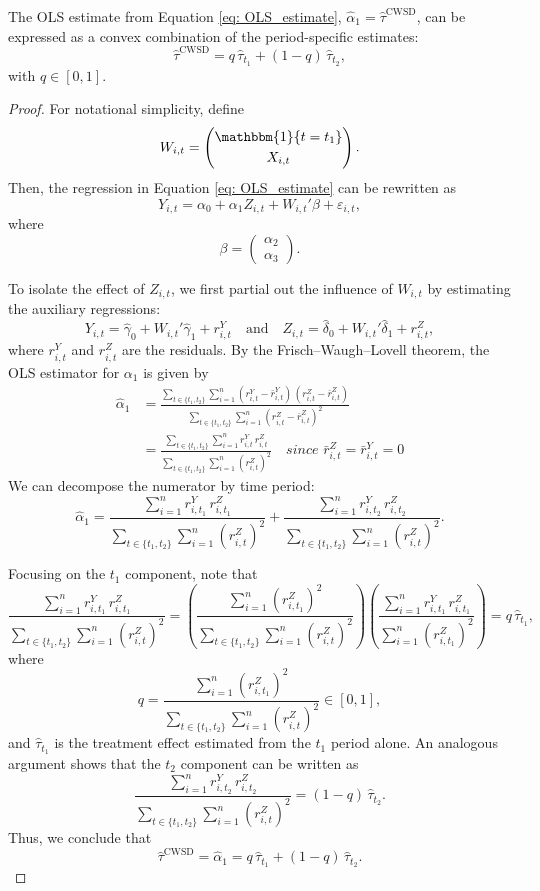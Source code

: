 \begin{reprop}
The OLS estimate from Equation \eqref{eq: OLS_estimate}, \(\hat{\alpha}_1 = \hat{\tau}^{\text{CWSD}}\), can be expressed as a convex combination of the period-specific estimates:
\[
\hat{\tau}^{\text{CWSD}} = q\,\hat{\tau}_{t_1} + (1-q)\,\hat{\tau}_{t_2},
\]
with \(q \in [0,1]\).
\end{reprop}

\begin{proof}
For notational simplicity, define
\[
W_{i,t} = \begin{pmatrix} \mathbbm{1}\{t = t_1\} \\[1mm] X_{i,t} \end{pmatrix}.
\]
Then, the regression in Equation \eqref{eq: OLS_estimate} can be rewritten as
\[
Y_{i,t} = \alpha_0 + \alpha_1 Z_{i,t} + W_{i,t}'\beta + \varepsilon_{i,t},
\]
where
\[
\beta = \begin{pmatrix} \alpha_2 \\ \alpha_3 \end{pmatrix}.
\]

To isolate the effect of \(Z_{i,t}\), we first partial out the influence of \(W_{i,t}\) by estimating the auxiliary regressions:
\[
Y_{i,t} = \hat{\gamma}_0 + W_{i,t}'\hat{\gamma}_1 + r^Y_{i,t} \quad \text{and} \quad Z_{i,t} = \hat{\delta}_0 + W_{i,t}'\hat{\delta}_1 + r^Z_{i,t},
\]
where \(r^Y_{i,t}\) and \(r^Z_{i,t}\) are the residuals. By the Frisch–Waugh–Lovell theorem, the OLS estimator for \(\alpha_1\) is given by
\[
\begin{aligned}
    \hat{\alpha}_1 &= \frac{\sum_{t\in\{t_1,t_2\}} \sum_{i=1}^n (r^Y_{i,t} - \bar{r}^Y_{i,t})\,(r^Z_{i,t} - \bar{r}^Z_{i,t})}{\sum_{t\in\{t_1,t_2\}} \sum_{i=1}^n (r^Z_{i,t} - \bar{r}^Z_{i,t})^2} \\
&= \frac{\sum_{t\in\{t_1,t_2\}} \sum_{i=1}^n r^Y_{i,t}\,r^Z_{i,t}}{\sum_{t\in\{t_1,t_2\}} \sum_{i=1}^n (r^Z_{i,t})^2} \quad since \,\,\bar{r}^Z_{i,t} = \bar{r}^Y_{i,t} = 0
\end{aligned}
\]
We can decompose the numerator by time period:
\[
\hat{\alpha}_1 = \frac{\sum_{i=1}^n r^Y_{i,t_1}\,r^Z_{i,t_1}}{\sum_{t\in\{t_1,t_2\}} \sum_{i=1}^n (r^Z_{i,t})^2} + \frac{\sum_{i=1}^n r^Y_{i,t_2}\,r^Z_{i,t_2}}{\sum_{t\in\{t_1,t_2\}} \sum_{i=1}^n (r^Z_{i,t})^2}.
\]

Focusing on the \(t_1\) component, note that
\[
\frac{\sum_{i=1}^n r^Y_{i,t_1}\,r^Z_{i,t_1}}{\sum_{t\in\{t_1,t_2\}} \sum_{i=1}^n (r^Z_{i,t})^2} = \left(\frac{\sum_{i=1}^n (r^Z_{i,t_1})^2}{\sum_{t\in\{t_1,t_2\}} \sum_{i=1}^n (r^Z_{i,t})^2}\right) \left(\frac{\sum_{i=1}^n r^Y_{i,t_1}\,r^Z_{i,t_1}}{\sum_{i=1}^n (r^Z_{i,t_1})^2}\right) = q\,\hat{\tau}_{t_1},
\]
where
\[
q = \frac{\sum_{i=1}^n (r^Z_{i,t_1})^2}{\sum_{t\in\{t_1,t_2\}} \sum_{i=1}^n (r^Z_{i,t})^2} \in [0,1],
\]
and \(\hat{\tau}_{t_1}\) is the treatment effect estimated from the \(t_1\) period alone. An analogous argument shows that the \(t_2\) component can be written as
\[
\frac{\sum_{i=1}^n r^Y_{i,t_2}\,r^Z_{i,t_2}}{\sum_{t\in\{t_1,t_2\}} \sum_{i=1}^n (r^Z_{i,t})^2} = (1-q)\,\hat{\tau}_{t_2}.
\]
Thus, we conclude that
\[
\hat{\tau}^{\text{CWSD}} = \hat{\alpha}_1 = q\,\hat{\tau}_{t_1} + (1-q)\,\hat{\tau}_{t_2}.
\]
\end{proof}

